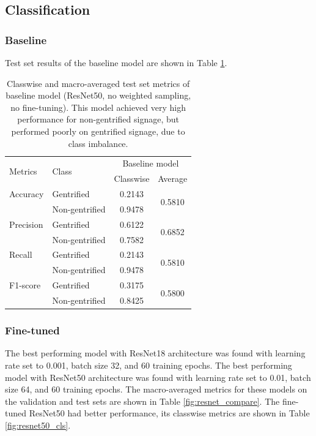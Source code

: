 \subsection{Classification}
\subsubsection{Baseline}
Test set results of the baseline model are shown in Table \ref{fig:baseline_metrics}. 

\begin{table}[h]
\begin{tabular}{llcc}
\toprule
\multirow{2}{*}{Metrics}   & \multirow{2}{*}{Class} & \multicolumn{2}{c}{Baseline model}        \\ \cline{3-4} 
                           &                        & Classwise & Average                 \\ \hline
Accuracy                   & Gentrified             & 0.2143    & \multirow{2}{*}{0.5810} \\
                           & Non-gentrified         & 0.9478    &                         \\
Precision                  & Gentrified             & 0.6122    & \multirow{2}{*}{0.6852} \\
                           & Non-gentrified         & 0.7582    &                         \\
Recall                     & Gentrified             & 0.2143    & \multirow{2}{*}{0.5810} \\
                           & Non-gentrified         & 0.9478    &                         \\
F1-score                   & Gentrified             & 0.3175    & \multirow{2}{*}{0.5800} \\
                           & Non-gentrified         & 0.8425    &                         \\
\bottomrule
\end{tabular}
\vspace{\baselineskip}
\caption{Classwise and macro-averaged test set metrics of baseline model (ResNet50, no weighted sampling, no fine-tuning). This model achieved very high performance for non-gentrified signage, but performed poorly on gentrified signage, due to class imbalance.}
\label{fig:baseline_metrics}
\vspace{-5mm}
\end{table}

\subsubsection{Fine-tuned}
The best performing model with ResNet18 architecture was found with learning rate set to 0.001, batch size 32, and 60 training epochs. The best performing model with ResNet50 architecture was found with learning rate set to 0.01, batch size 64, and 60 training epochs. The macro-averaged metrics for these models on the validation and test sets are shown in Table \ref{fig:resnet_compare}. The fine-tuned ResNet50 had better performance, its classwise metrics are shown in Table \ref{fig:resnet50_cls}.

